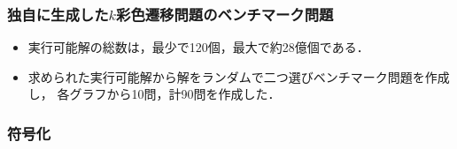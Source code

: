\begin{frame}\frametitle{独自に生成した$k$彩色遷移問題のベンチマーク問題}

  \begin{exampleblock}{}
    \centering
    
  \end{exampleblock}

  \begin{itemize}
  \item 実行可能解の総数は，最少で120個，最大で約28億個である．
  \item 求められた実行可能解から解をランダムで二つ選びベンチマーク問題を作成し，
        各グラフから10問，計90問を作成した．
  \end{itemize}

\end{frame}

\begin{frame}\frametitle{符号化}

  \begin{exampleblock}{}
    \centering
    
  \end{exampleblock}
  
\end{frame}

